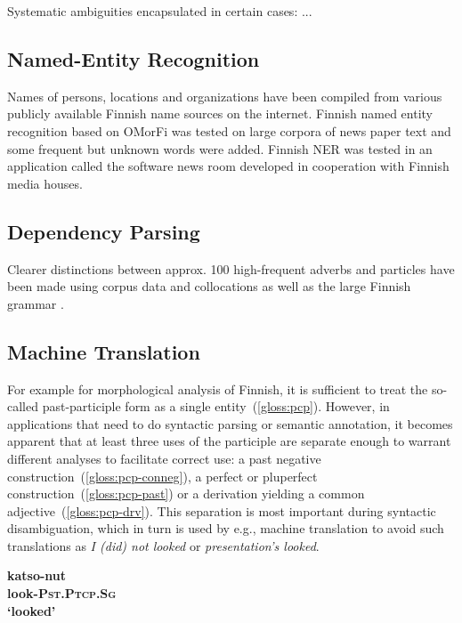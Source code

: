 \documentclass[11pt]{article}
\begin{document}
Systematic ambiguities encapsulated in certain cases: ...

\subsection{Named-Entity Recognition}

Names of persons, locations and organizations have been compiled from various
publicly available Finnish name sources on the internet.  Finnish named entity
recognition based on OMorFi was tested on large corpora of news paper text and
some frequent but unknown words were added.  Finnish NER was tested in an
application called the software news room \cite{huovelinsoftware} developed in
cooperation with Finnish media houses. 

\subsection{Dependency Parsing}

Clearer distinctions between approx. 100 high-frequent adverbs and particles
have been made using corpus data and collocations as well as the large Finnish
grammar \cite{visk}.

\subsection{Machine Translation}

For example for morphological analysis of Finnish, it is sufficient to treat
the so-called past-participle form as a single entity~(\ref{gloss:pcp}).
However, in applications that need to do syntactic parsing or semantic
annotation, it becomes apparent that at least three uses of the participle are
separate enough to warrant different analyses to facilitate correct use: a past
negative construction~(\ref{gloss:pcp-conneg}), a perfect or pluperfect
construction~(\ref{gloss:pcp-past}) or a derivation yielding a common
adjective~(\ref{gloss:pcp-drv}). This separation is most important during
syntactic disambiguation, which in turn is used by e.g., machine translation to
avoid such translations as \emph{I (did) not looked} or \emph{presentation's
looked}.

\begin{exe}
    \ex \label{gloss:pcp}
    \gll \bf katso-nut \\
    \small look-\textsc{Pst.Ptcp.Sg} \\
    \glt `looked'
\end{exe}
\end{document}
